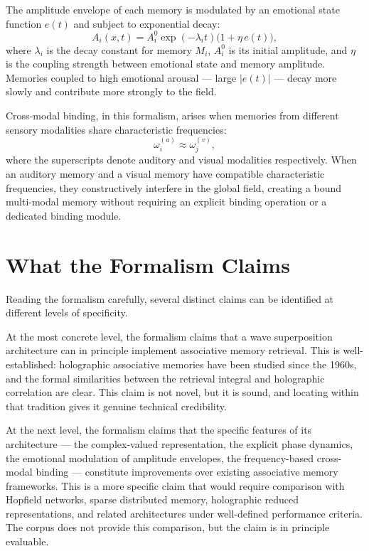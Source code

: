 The amplitude envelope of each memory is modulated by an emotional
state function $e(t)$ and subject to exponential decay:
\[
  A_i(x,t) = A_i^0 \exp(-\lambda_i t)\bigl(1 + \eta\, e(t)\bigr),
\]
where $\lambda_i$ is the decay constant for memory $M_i$, $A_i^0$
is its initial amplitude, and $\eta$ is the coupling strength
between emotional state and memory amplitude. Memories coupled
to high emotional arousal --- large $|e(t)|$ --- decay more slowly
and contribute more strongly to the field.

Cross-modal binding, in this formalism, arises when memories from
different sensory modalities share characteristic frequencies:
\[
  \omega_i^{(a)} \approx \omega_j^{(v)},
\]
where the superscripts denote auditory and visual modalities
respectively. When an auditory memory and a visual memory have
compatible characteristic frequencies, they constructively interfere
in the global field, creating a bound multi-modal memory without
requiring an explicit binding operation or a dedicated binding
module.

\section{What the Formalism Claims}
\label{sec:mem8-claims}

Reading the \MEMeight{} formalism carefully, several distinct claims
can be identified at different levels of specificity.

At the most concrete level, the formalism claims that a wave
superposition architecture can in principle implement associative
memory retrieval. This is well-established: holographic associative
memories have been studied since the 1960s, and the formal
similarities between the \MEMeight{} retrieval integral and
holographic correlation are clear. This claim is not novel, but
it is sound, and locating \MEMeight{} within that tradition gives
it genuine technical credibility.

At the next level, the formalism claims that the specific features
of its architecture --- the complex-valued representation, the
explicit phase dynamics, the emotional modulation of amplitude
envelopes, the frequency-based cross-modal binding --- constitute
improvements over existing associative memory frameworks. This is
a more specific claim that would require comparison with Hopfield
networks, sparse distributed memory, holographic reduced
representations, and related architectures under well-defined
performance criteria. The corpus does not provide this comparison,
but the claim is in principle evaluable.

